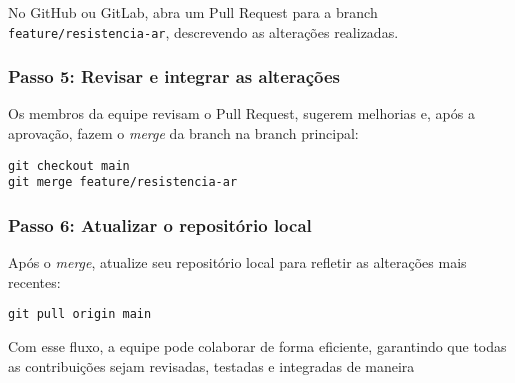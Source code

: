No GitHub ou GitLab, abra um Pull Request para a branch \texttt{feature/resistencia-ar}, descrevendo as alterações realizadas.

\subsubsection*{Passo 5: Revisar e integrar as alterações}

Os membros da equipe revisam o Pull Request, sugerem melhorias e, após a aprovação, fazem o \textit{merge} da branch na branch principal:
\begin{lstlisting}[style=shellstyle]
git checkout main
git merge feature/resistencia-ar
\end{lstlisting}

\subsubsection*{Passo 6: Atualizar o repositório local}

Após o \textit{merge}, atualize seu repositório local para refletir as alterações mais recentes:
\begin{lstlisting}[style=shellstyle]
git pull origin main
\end{lstlisting}

Com esse fluxo, a equipe pode colaborar de forma eficiente, garantindo que todas as contribuições sejam revisadas, testadas e integradas de maneira